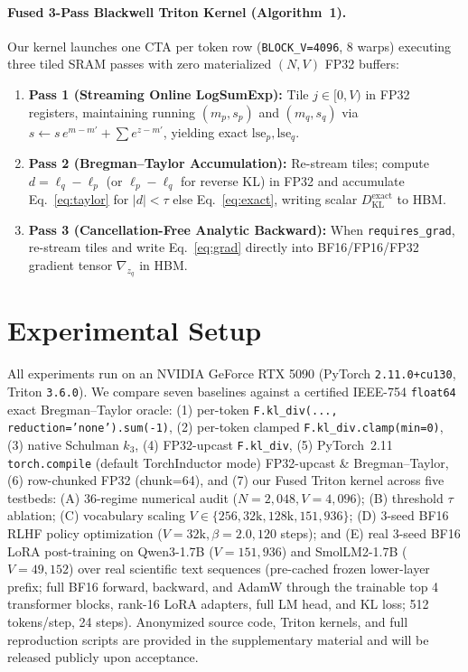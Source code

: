 \documentclass[10pt]{article}
\newcommand{\KL}{D_{\mathrm{KL}}}
\begin{document}
\paragraph{Fused 3-Pass Blackwell Triton Kernel (Algorithm~1).} Our kernel launches one CTA per token row (\texttt{BLOCK\_V=4096}, 8 warps) executing three tiled SRAM passes with zero materialized $(N,V)$ FP32 buffers:
\begin{enumerate}[leftmargin=1.6em,itemsep=1pt,topsep=2pt]
  \item \textbf{Pass 1 (Streaming Online LogSumExp):} Tile $j \in [0, V)$ in FP32 registers, maintaining running $(m_p, s_p)$ and $(m_q, s_q)$ via $s \leftarrow s\,e^{m - m'} + \sum e^{z - m'}$, yielding exact $\mathrm{lse}_p, \mathrm{lse}_q$.
  \item \textbf{Pass 2 (Bregman--Taylor Accumulation):} Re-stream tiles; compute $d = \ell_q - \ell_p$ (or $\ell_p - \ell_q$ for reverse KL) in FP32 and accumulate Eq.~\eqref{eq:taylor} for $|d| < \tau$ else Eq.~\eqref{eq:exact}, writing scalar $\KL^{\mathrm{exact}}$ to HBM.
  \item \textbf{Pass 3 (Cancellation-Free Analytic Backward):} When \texttt{requires\_grad}, re-stream tiles and write Eq.~\eqref{eq:grad} directly into BF16/FP16/FP32 gradient tensor $\nabla_{z_q}$ in HBM.
\end{enumerate}

\section{Experimental Setup}
All experiments run on an NVIDIA GeForce RTX 5090 (PyTorch \texttt{2.11.0+cu130}, Triton \texttt{3.6.0}). We compare seven baselines against a certified IEEE-754 \texttt{float64} exact Bregman--Taylor oracle: (1) per-token \texttt{F.kl\_div(..., reduction='none').sum(-1)}, (2) per-token clamped \texttt{F.kl\_div.clamp(min=0)}, (3) native Schulman $k_3$, (4) FP32-upcast \texttt{F.kl\_div}, (5) PyTorch~2.11 \texttt{torch.compile} (default TorchInductor mode) FP32-upcast \& Bregman--Taylor, (6) row-chunked FP32 (chunk=64), and (7) our Fused Triton kernel across five testbeds: (A) 36-regime numerical audit ($N=2{,}048, V=4{,}096$); (B) threshold $\tau$ ablation; (C) vocabulary scaling $V \in \{256, 32\text{k}, 128\text{k}, 151{,}936\}$; (D) 3-seed BF16 RLHF policy optimization ($V=32\text{k}, \beta=2.0, 120$ steps); and (E) real 3-seed BF16 LoRA post-training on Qwen3-1.7B ($V=151{,}936$) and SmolLM2-1.7B ($V=49{,}152$) over real scientific text sequences (pre-cached frozen lower-layer prefix; full BF16 forward, backward, and AdamW through the trainable top 4 transformer blocks, rank-16 LoRA adapters, full LM head, and KL loss; 512 tokens/step, 24 steps). Anonymized source code, Triton kernels, and full reproduction scripts are provided in the supplementary material and will be released publicly upon acceptance.
\end{document}
